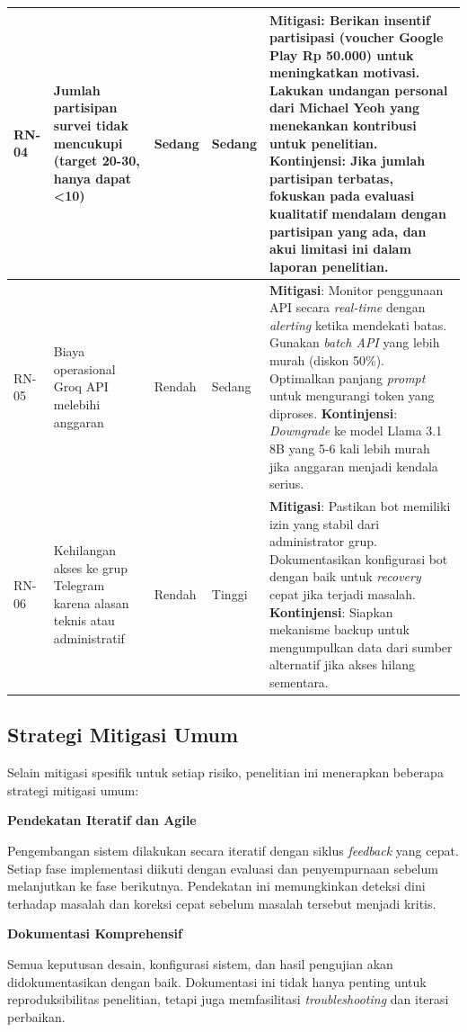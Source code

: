 \begin{longtable}{|p{1cm}|p{3.5cm}|p{2cm}|p{2cm}|p{5cm}|}
RN-04 & Jumlah partisipan survei tidak mencukupi (target 20-30, hanya dapat <10) & Sedang & Sedang & \textbf{Mitigasi}: Berikan insentif partisipasi (voucher Google Play Rp 50.000) untuk meningkatkan motivasi. Lakukan undangan personal dari Michael Yeoh yang menekankan kontribusi untuk penelitian. \textbf{Kontinjensi}: Jika jumlah partisipan terbatas, fokuskan pada evaluasi kualitatif mendalam dengan partisipan yang ada, dan akui limitasi ini dalam laporan penelitian. \\
\hline

RN-05 & Biaya operasional Groq API melebihi anggaran & Rendah & Sedang & \textbf{Mitigasi}: Monitor penggunaan API secara \textit{real-time} dengan \textit{alerting} ketika mendekati batas. Gunakan \textit{batch API} yang lebih murah (diskon 50\%). Optimalkan panjang \textit{prompt} untuk mengurangi token yang diproses. \textbf{Kontinjensi}: \textit{Downgrade} ke model Llama 3.1 8B yang 5-6 kali lebih murah jika anggaran menjadi kendala serius. \\
\hline

RN-06 & Kehilangan akses ke grup Telegram karena alasan teknis atau administratif & Rendah & Tinggi & \textbf{Mitigasi}: Pastikan bot memiliki izin yang stabil dari administrator grup. Dokumentasikan konfigurasi bot dengan baik untuk \textit{recovery} cepat jika terjadi masalah. \textbf{Kontinjensi}: Siapkan mekanisme backup untuk mengumpulkan data dari sumber alternatif jika akses hilang sementara. \\
\hline
\end{longtable}

\subsection{Strategi Mitigasi Umum}

Selain mitigasi spesifik untuk setiap risiko, penelitian ini menerapkan beberapa strategi mitigasi umum:

\textbf{Pendekatan Iteratif dan Agile}

Pengembangan sistem dilakukan secara iteratif dengan siklus \textit{feedback} yang cepat. Setiap fase implementasi diikuti dengan evaluasi dan penyempurnaan sebelum melanjutkan ke fase berikutnya. Pendekatan ini memungkinkan deteksi dini terhadap masalah dan koreksi cepat sebelum masalah tersebut menjadi kritis.

\textbf{Dokumentasi Komprehensif}

Semua keputusan desain, konfigurasi sistem, dan hasil pengujian akan didokumentasikan dengan baik. Dokumentasi ini tidak hanya penting untuk reproduksibilitas penelitian, tetapi juga memfasilitasi \textit{troubleshooting} dan iterasi perbaikan.

